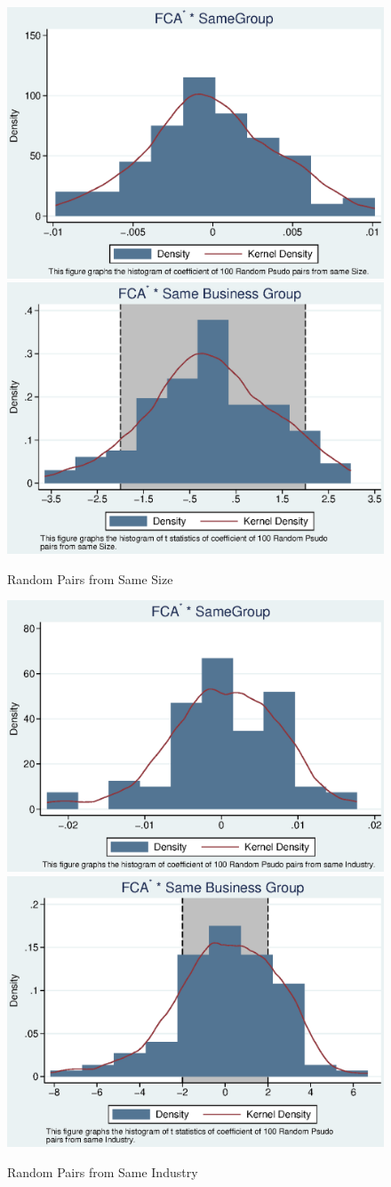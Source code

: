 \documentclass[12pt, a4paper]{article}
\begin{document}
		\begin{figure}
			\centering
			\caption{Random Pairs from Same Size}
			\includegraphics[width=0.45\linewidth]{SizePseudoSBFCA.eps}
			\includegraphics[width=0.45\linewidth]{SizePseudoSBFCA_t.eps}
		\end{figure}





		


		\begin{figure}
			\centering
			\caption{Random Pairs from Same Industry}
			\includegraphics[width=0.45\linewidth]{IndustryPseudoSBFCA.eps}	
			\includegraphics[width=0.45\linewidth]{IndustryPseudoSBFCA_t.eps}
		\end{figure}
\end{document}
